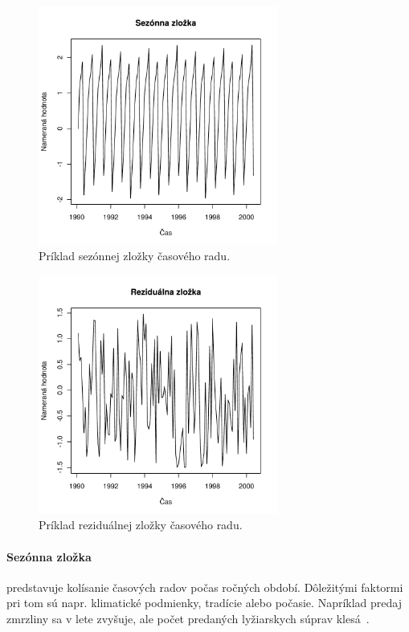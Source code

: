 \documentclass[a4paper,slovak,12pt,appendix]{article}
\begin{document}
\begin{figure}[H]
  \centering
  \includegraphics[width=0.7\textwidth]{season_component.pdf}
  \caption{Príklad sezónnej zložky časového radu.}
  \label{fig-season-comp}
\end{figure}

\begin{figure}[H]
  \centering
  \includegraphics[width=0.7\textwidth]{random_component.pdf}
  \caption{Príklad reziduálnej zložky časového radu.}
  \label{fig-random-comp}
\end{figure}

\paragraph{Sezónna zložka} predstavuje kolísanie časových radov počas ročných
období. Dôležitými faktormi pri tom sú napr. klimatické podmienky, tradície
alebo počasie. Napríklad predaj zmrzliny sa v lete zvyšuje, ale počet
predaných lyžiarskych súprav klesá~\cite{Agrawal2013}.
\end{document}
